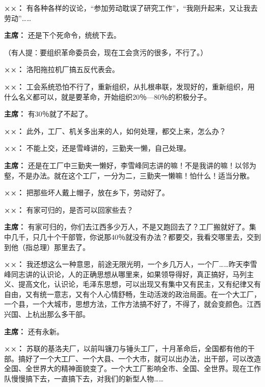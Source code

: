 \begin{list}{}
\item[\textbf{××：}] 有各种各样的议论，“参加劳动耽误了研究工作”，“我刚升起来，又让我去劳动”……

\item[\textbf{主席：}] 还是下个死命令，统统下去。

（有人提：要组织革命委员会，现在工会贪污的很多，不行了。）

\item[\textbf{××：}] 洛阳拖拉机厂搞五反代表会。

\item[\textbf{××：}] 工会系统恐怕不行了，重新组织，从扎根串联，发现好的，重新组织，用什么名义都可以，就是要革命，开始组织20％—80％的积极分子。

\item[\textbf{主席：}] 有30％就了不起了。

\item[\textbf{××：}] 此外，工厂、机关多出来的人，如何处理，都交上来，怎么办？

\item[\textbf{××：}] 不能上交，还是雪峰讲的，三勤夹一懒，自己处理。

\item[\textbf{主席：}] 还是在工厂中三勤夹一懒好，李雪峰同志讲的嘛！不是我讲的嘛！以邻为壑，不是办法。就在这个工厂，一分为二，三勤夹一懒嘛！怕什么！适当分散。

\item[\textbf{××：}] 把那些坏人戴上帽子，放在乡下，劳动好了。

\item[\textbf{××：}] 有家可归的，是否可以回家些去？

\item[\textbf{主席：}] 有家可归的，你们去江西多少万人，不是又跑回去了？工厂搬就好了。集中几千，只几十个干部管，你说那40％就没有办法？都要交，我看交哪里去，交到到他（指总理）那里去了。

\item[\textbf{××：}] 我还想这么一种意思，前途无限光明，一个乡几万人，一个厂……昨天李雪峰同志讲的认识论，人的正确思想从哪里来，如果领导得好，真正搞好，马列主义、提高文化，认识论，毛泽东思想，可以出现又有集中又有民主，又有纪律又有自由，又有统一意志，又有个人心情舒畅，生动活泼的政治局面。在一个大工厂，一个县，一个大城市，思想方法，工作方法搞不好了，不得了，就会变颜色。江西兴国、上杭出那么多干部。

\item[\textbf{主席：}] 还有永新。

\item[\textbf{××：}] 苏联的基洛夫厂，以前叫镰刀与锤头工厂，十月革命后，全国都有他的干部。搞好了一个大工厂、一个大县、一个大市，就可以出办法，出干部，可以改造全国、全世界大的精神面貌变了。一个大工厂影响全市、全国、全世界。现在工作队慢慢搞下去，一直搞下去，对我们的新型人物……


\end{list}
